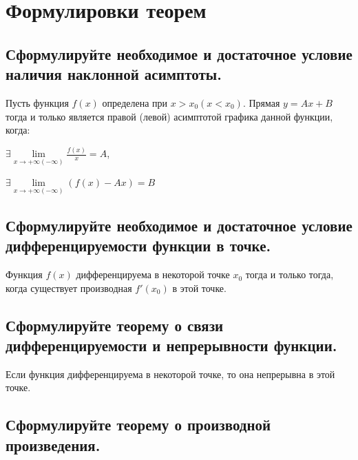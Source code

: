 

\section{Формулировки теорем}
\subsection{Сформулируйте необходимое и достаточное условие наличия наклонной асимптоты.}

Пусть функция $f(x)$ определена при $x > x_0 (x < x_0)$. Прямая $y = Ax + B$ тогда и только является правой (левой) асимптотой графика данной функции, когда: 

$\exists \lim\limits_{x \to +\infty (- \infty)}\frac{f(x)}{x} = A$,

$\exists \lim\limits_{x \to +\infty (- \infty)} (f(x)-Ax) = B$


\subsection{Сформулируйте необходимое и достаточное условие дифференцируемости функции в точке.}

Функция $f(x)$ дифференцируема в некоторой точке $x_0$ тогда и только тогда, когда существует производная $f'(x_0)$ в этой точке.


\subsection{Сформулируйте теорему о связи дифференцируемости и непрерывности функции.}

Если функция дифференцируема в некоторой точке, то она непрерывна в этой точке.


\subsection{Сформулируйте теорему о производной произведения.}

